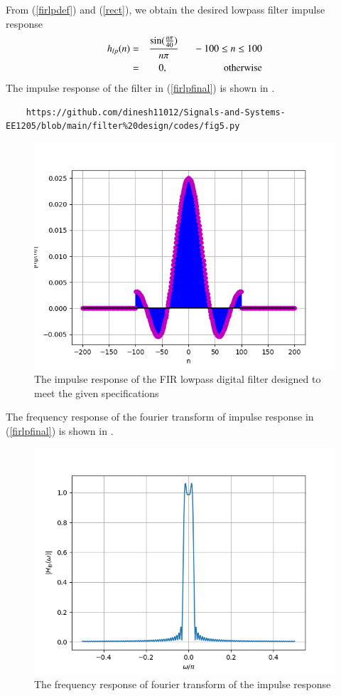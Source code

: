 \documentclass{article}
\begin{document}
From (\ref{firlpdef}) and (\ref{rect}), we obtain the desired lowpass filter impulse response
\begin{eqnarray}
\label{firlpfinal}
h_{lp}(n) &=& \frac{\sin(\frac{n\pi}{40})}{n\pi} \indent -100 \leq n \leq 100 \nonumber \\
&=& 0, \hspace{2cm} \mbox{otherwise}
\end{eqnarray}
The impulse  response of the filter in (\ref{firlpfinal}) is shown in .
\begin{lstlisting}
	https://github.com/dinesh11012/Signals-and-Systems-EE1205/blob/main/filter%20design/codes/fig5.py
\end{lstlisting}
\begin{figure}[H]
\includegraphics[width = \columnwidth]{figs/hlp.png}
\caption{The impulse response of the FIR lowpass digital filter designed to meet the given specifications} 
\label{fig6}
\end{figure}

The frequency response of the fourier transform of impulse response in (\ref{firlpfinal}) is shown in . 
\begin{figure}[H]
\includegraphics[width = \columnwidth]{figs/Hlp.png}
\caption{The frequency response of fourier transform of the impulse response}
\label{fig7}
\end{figure}
\end{document}
